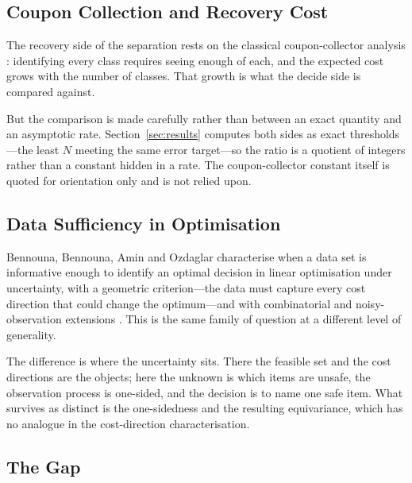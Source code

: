 \subsection{Coupon Collection and Recovery Cost}

The recovery side of the separation rests on the classical coupon-collector analysis
\cite{motwani1995}: identifying every class requires seeing enough of each, and the expected
cost grows with the number of classes. That growth is what the decide side is compared
against.

But the comparison is made carefully rather than between an exact quantity and an asymptotic
rate. Section~\ref{sec:results} computes both sides as exact thresholds---the least $N$
meeting the same error target---so the ratio is a quotient of integers rather than a constant
hidden in a rate. The coupon-collector constant itself is quoted for orientation only and is
not relied upon.

\subsection{Data Sufficiency in Optimisation}

Bennouna, Bennouna, Amin and Ozdaglar characterise when a data set is informative enough to
identify an optimal decision in linear optimisation under uncertainty, with a geometric
criterion---the data must capture every cost direction that could change the optimum---and
with combinatorial and noisy-observation extensions \cite{bennouna2026}. This is the same
family of question at a different level of generality.

The difference is where the uncertainty sits. There the feasible set and the cost directions
are the objects; here the unknown is which items are unsafe, the observation process is
one-sided, and the decision is to name one safe item. What survives as distinct is the
one-sidedness and the resulting equivariance, which has no analogue in the cost-direction
characterisation.

\subsection{The Gap}

